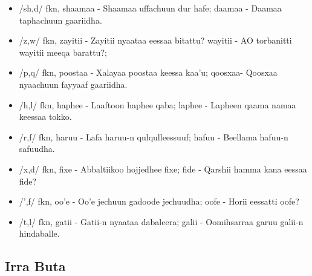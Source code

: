 \documentclass[11pt,b5paper]{book}
\begin{document}
\begin{itemize}
        \item/sh,d/ fkn, shaamaa - Shaamaa uffachuun dur hafe; daamaa - Daamaa taphachuun gaariidha. 
        \item/z,w/ fkn, zayitii - Zayitii nyaataa eessaa bitattu? wayitii - AO torbanitti wayitii meeqa barattu?; 
        \item/p,q/ fkn, poostaa - Xalayaa poostaa keessa kaa’u; qoosxaa- Qoosxaa nyaachuun fayyaaf gaariidha. 
        \item/h,l/ fkn, haphee - Laaftoon haphee qaba; laphee - Lapheen qaama namaa keessaa tokko. 
        \item/r,f/ fkn, haruu - Lafa haruu-n qulqulleessuuf; hafuu - Beellama hafuu-n safuudha.
        \item/x,d/ fkn, fixe - Abbaltiikoo hojjedhee fixe; fide - Qarshii hamma kana eessaa fide? 
        \item/’,f/ fkn, oo’e - Oo’e jechuun gadoode jechuudha; oofe - Horii eessatti oofe? 
        \item/t,l/ fkn, gatii - Gatii-n nyaataa dabaleera; galii - Oomihsarraa garuu galii-n hindaballe.

\end{itemize}  

\subsection{Irra Buta}
\end{document}
